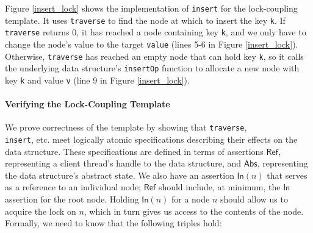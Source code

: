 \documentclass[sigplan,screen]{acmart}
\newcommand{\treerep}{\ensuremath{\mathsf{Abs}}}
\newcommand{\nodeboxrep}{\ensuremath{\mathsf{Ref }}}
\newcommand{\inFP}{\ensuremath{\mathsf{In }}}
\begin{document}
{%

Figure \ref{insert_lock} shows the implementation of \lstinline{insert} for the lock-coupling template.
It uses \texttt{traverse} to find the node at which to insert the key \lstinline{k}. If \texttt{traverse} returns 0, it has reached a node containing key \texttt{k}, and we only have to change the node's value to the target \texttt{value} (lines 5-6 in Figure \ref{insert_lock}). Otherwise, \texttt{traverse} has reached an empty node that can hold key \texttt{k}, so it calls the underlying data structure's \texttt{insertOp} function to allocate a new node with key \texttt{k} and value \texttt{v} (line 9 in Figure \ref{insert_lock}).

\paragraph{Verifying the Lock-Coupling Template}
\label{traverse_proof_lock}

We prove correctness of the template by showing that \lstinline{traverse}, \\ \lstinline{insert}, etc. meet logically atomic specifications describing their effects on the data structure. These specifications are defined in terms of assertions $\nodeboxrep$, representing a client thread's handle to the data structure, and $\treerep$, representing the data structure's abstract state. We also have an assertion $\inFP(n)$ that serves as a reference to an individual node; $\nodeboxrep$ should include, at minimum, the $\inFP$ assertion for the root node.
Holding $\inFP(n)$ for a node $n$ should allow us to acquire the lock on $n$, which in turn gives us access to the contents of the node. Formally, we need to know that the following triples hold:

}
\end{document}
